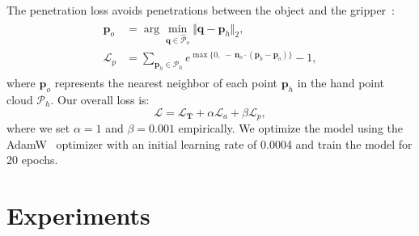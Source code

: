 \documentclass[11pt, a4paper, logo, twocolumn]{brown}
\begin{document}
The penetration loss avoids penetrations between the object and the gripper~\cite{yang_cpf_2021, yang_learning_2024_tpami, brahmbhatt_contactgrasp_2019}:
\begin{align}
\begin{split}
\mathbf{p}_o &= \arg\min_{\mathbf{q} \in \widehat{\mathcal{P}}_o} \Vert \mathbf{q} - \mathbf{p}_h \Vert_2, \\
\mathcal{L}_p &= \sum_{\mathbf{p}_h \in \mathcal{P}_h}
e^{
\max\{0,\; -\,\mathbf{n}_o \cdot (\mathbf{p}_h - \mathbf{p}_o)\}
} - 1,
\end{split}
\end{align}
where $\mathbf{p}_o$ represents the nearest neighbor of each point $\mathbf{p}_h$ in the hand point cloud $\mathcal{P}_h$.
Our overall loss is:
\begin{equation}
    \mathcal{L} = \mathcal{L}_\mathbf{T} + \alpha \mathcal{L}_a + \beta \mathcal{L}_p,
\end{equation}
where we set $\alpha=1$ and $\beta=0.001$ empirically.
We optimize the model using the AdamW~\cite{loshchilov_decoupled_2018} optimizer with an initial learning rate of 0.0004 and train the model for 20 epochs.

\section{Experiments}
\end{document}

